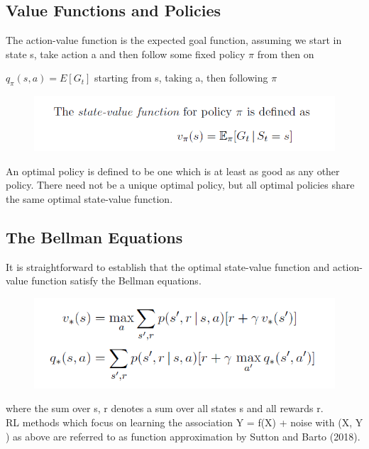 \documentclass{article}
\begin{document}
\subsection{Value Functions and Policies}
The action-value function is the expected goal function, assuming we start in state s, take action a and then follow some fixed policy $\pi$ from then on\\
\begin{center}
$q_\pi (s,a) = E[G_t]$ starting from s, taking a, then following $\pi $
\end{center}


\begin{figure}[H]
\begin{center}
\includegraphics[scale = 0.5]{State.png}
\end{center}
\end{figure}

An optimal policy is defined to be one which is at least as good as any other policy. There need not be a unique optimal policy, but all optimal policies share the same optimal state-value function.

\subsection{The Bellman Equations }

It is straightforward to establish that the optimal state-value function and action-value function satisfy the Bellman equations.

\begin{figure}[H]
\begin{center}
\includegraphics[scale = 0.5]{Bell.png}
\end{center}
\end{figure}

where the sum over s, r denotes a sum over all states s and all rewards r.\\
RL methods which focus on learning the association Y = f(X) + noise with (X, Y ) as above are referred to as function approximation by Sutton and Barto (2018).
\end{document}
